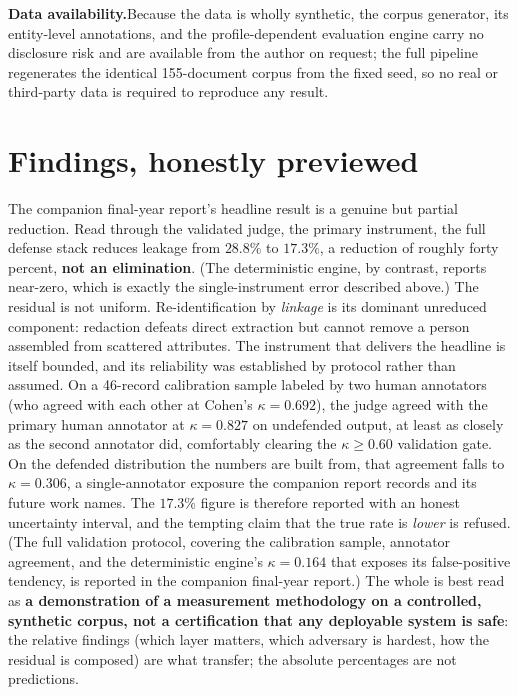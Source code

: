 \documentclass[12pt,a4paper]{report}
\begin{document}
\textbf{Data availability.}\quad Because the data is wholly synthetic, the corpus generator, its
entity-level annotations, and the profile-dependent evaluation engine carry no disclosure risk and
are available from the author on request; the full pipeline regenerates the identical 155-document
corpus from the fixed seed, so no real or third-party data is required to reproduce any result.

\section{Findings, honestly previewed}
\label{sec:intro-findings}

The companion final-year report's headline result is a genuine but partial reduction. Read through
the validated judge, the
primary instrument, the full defense stack reduces leakage from $28.8\%$ to $17.3\%$, a reduction
of roughly forty percent, \textbf{not an elimination}. (The deterministic engine, by contrast,
reports near-zero, which is exactly the single-instrument error described above.) The residual is
not uniform. Re-identification by \emph{linkage} is its dominant unreduced component: redaction
defeats direct extraction but cannot remove a person assembled from scattered attributes.
The instrument that delivers the headline is
itself bounded, and its reliability was established by protocol rather than assumed. On a 46-record
calibration sample labeled by two human annotators (who agreed with each other at Cohen's
$\kappa = 0.692$), the judge agreed with the primary human annotator at $\kappa = 0.827$ on
undefended output, at least as closely as the second annotator did, comfortably clearing the
$\kappa \geq 0.60$ validation gate. On the defended distribution the numbers are built from, that
agreement falls to $\kappa = 0.306$, a single-annotator exposure the companion report records and its
future work names. The $17.3\%$ figure is therefore reported with an honest uncertainty interval, and
the tempting claim that the true rate is \emph{lower} is refused. (The full validation protocol, covering the
calibration sample, annotator agreement, and the deterministic engine's $\kappa = 0.164$ that exposes
its false-positive tendency, is reported in the companion final-year report.) The whole is best read as
\textbf{a demonstration of a measurement methodology on a controlled, synthetic corpus, not a
certification that any deployable system is safe}: the relative findings (which layer matters,
which adversary is hardest, how the residual is composed) are what transfer; the absolute
percentages are not predictions.
\end{document}
